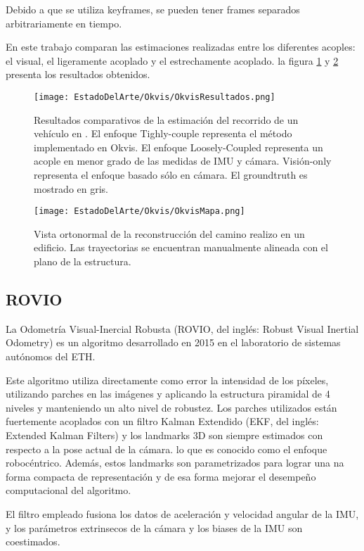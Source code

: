 Debido a que se utiliza keyframes, se pueden tener frames separados arbitrariamente en tiempo. 

En este trabajo comparan las estimaciones realizadas entre los diferentes acoples: el visual, el ligeramente acoplado y el estrechamente acoplado. la figura \ref{fig:RovioEstimacion} y \ref{fig:RovioEstimacionMapa} presenta los resultados obtenidos.

\begin{figure}[H]
	\centering
	\texttt{[image: EstadoDelArte/Okvis/OkvisResultados.png]}
	\caption{Resultados comparativos de la estimación del recorrido de un vehículo  en . El enfoque Tighly-couple representa el método implementado en Okvis. El enfoque Loosely-Coupled representa un acople en menor grado de las medidas de IMU y cámara. Visión-only representa el enfoque basado sólo en cámara. El groundtruth es mostrado en gris.}
	\label{fig:RovioEstimacion}
\end{figure}


\begin{figure}[H]
	\centering
	\texttt{[image: EstadoDelArte/Okvis/OkvisMapa.png]}
	\caption{Vista ortonormal de la reconstrucción del camino realizo en un edificio. Las trayectorias se encuentran manualmente alineada con el plano de la estructura.}
	\label{fig:RovioEstimacionMapa}
\end{figure}


\subsection{ROVIO}

La Odometría Visual-Inercial Robusta (ROVIO, del inglés: Robust Visual Inertial Odometry) es un algoritmo desarrollado en 2015 en el laboratorio de sistemas autónomos del ETH.

Este algoritmo utiliza directamente como error la intensidad de los píxeles, utilizando parches en las  imágenes y aplicando la estructura piramidal de 4 niveles y manteniendo un alto nivel de robustez. Los parches utilizados están fuertemente acoplados con un filtro Kalman Extendido (EKF, del inglés: Extended Kalman Filters) y los landmarks 3D son siempre estimados con respecto a la pose actual de la cámara. lo que es conocido como el enfoque robocéntrico. Además, estos landmarks son parametrizados para lograr una na forma compacta de representación y de esa forma mejorar el desempeño computacional del algoritmo. 

El filtro empleado fusiona los datos de aceleración y velocidad angular de la IMU, y los parámetros extrinsecos de la cámara y los biases de la IMU son coestimados. 

